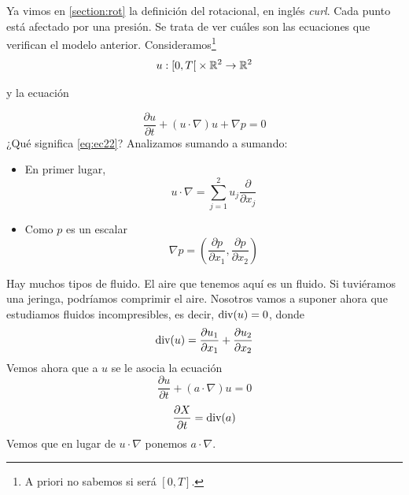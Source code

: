 \begin{figure}[H]
\begin{center}
    \end{center}
\end{figure}
Ya vimos en \ref{section:rot} la definición del rotacional, en inglés \textit{curl}. Cada punto está afectado por una presión. Se trata de ver cuáles son las ecuaciones que verifican el modelo anterior.
Consideramos\footnote{A priori no sabemos si será $[0,T]$.}
\begin{equation}\label{eq:ec24}
    u : \left[0, T \right[ \times \mathbb{R}^2 \to \mathbb{R}^2
\end{equation}
    
y la ecuación 

\begin{equation}\label{eq:ec22}
    \dfrac{\partial u}{\partial t} + (u \cdot \nabla) u + \nabla p = 0
\end{equation}
¿Qué significa \eqref{eq:ec22}? Analizamos sumando a sumando:
\begin{itemize}
    \item En primer lugar, $$u \cdot \nabla = \sum_{j=1}^{2} u_j \dfrac{\partial}{\partial x_j}$$
    \item Como $p$ es un escalar $$\nabla p = \left( \dfrac{\partial p}{\partial x_1}, \dfrac{\partial p}{\partial x_2} \right)$$ 
\end{itemize}

Hay muchos tipos de fluido. El aire que tenemos aquí es un fluido. Si tuviéramos una jeringa, podríamos comprimir el aire. Nosotros vamos a 
suponer ahora que estudiamos fluidos incompresibles, es decir, $\text{div}(u) = 0$, donde
$$\text{div}(u) = \dfrac{\partial u_1}{\partial x_1} + \dfrac{\partial u_2}{\partial x_2}$$
Vemos ahora que a $u$ se le asocia la ecuación
$$\dfrac{\partial u}{\partial t} + (a \cdot \nabla) u = 0$$
$$\dfrac{\partial X}{\partial t} = \text{div}(a)$$
Vemos que en lugar de $u \cdot \nabla$ ponemos $a \cdot \nabla$. \\

